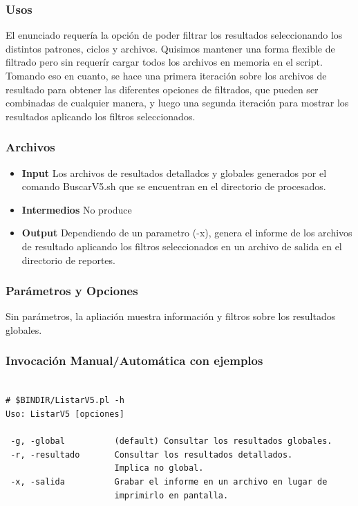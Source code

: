 \documentclass[a4paper,10pt,titlepage]{article}
\begin{document}
		\subsubsection{Usos}
			 
El enunciado requería la opción de poder filtrar los resultados seleccionando los distintos patrones, ciclos y archivos. Quisimos mantener una forma flexible de filtrado pero sin requerír cargar todos los archivos en memoria en el script. Tomando eso en cuanto, se hace una primera iteración sobre los archivos de resultado para obtener las diferentes opciones de filtrados, que pueden ser combinadas de cualquier manera, y luego una segunda iteración para mostrar los resultados aplicando los filtros seleccionados.

		\subsubsection{Archivos}
			\begin {itemize}
				\item \textbf{Input} {Los archivos de resultados detallados y globales generados por el comando BuscarV5.sh que se encuentran en el directorio de procesados.}
				\item \textbf{Intermedios} {No produce}
				\item \textbf{Output} {Dependiendo de un parametro (-x), genera el informe de los archivos de resultado aplicando los filtros seleccionados en un archivo de salida en el directorio de reportes.}
			\end{itemize}



		\subsubsection{Par\'ametros y Opciones}
		
Sin parámetros, la apliación muestra información y filtros sobre los resultados globales.
	
		\subsubsection{Invocaci\'on Manual/Autom\'atica con ejemplos}

\begin{verbatim}

# $BINDIR/ListarV5.pl -h
Uso: ListarV5 [opciones]

 -g, -global          (default) Consultar los resultados globales.
 -r, -resultado       Consultar los resultados detallados.
                      Implica no global.
 -x, -salida          Grabar el informe en un archivo en lugar de
                      imprimirlo en pantalla.
\end{verbatim}
\end{document}
